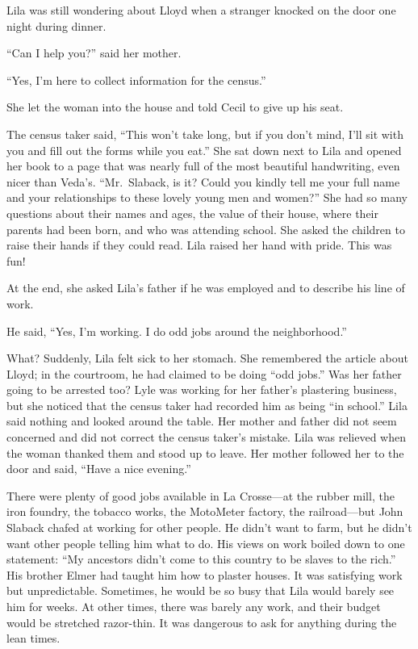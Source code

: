 \documentclass[
  american,
  letterpaper,
]{book}
\begin{document}
Lila was still wondering about Lloyd when a stranger knocked on the door
one night during dinner.

``Can I help you?'' said her mother.

``Yes, I'm here to collect information for the census.''

She let the woman into the house and told Cecil to give up his seat.

The census taker said, ``This won't take long, but if you don't mind,
I'll sit with you and fill out the forms while you eat.'' She sat down
next to Lila and opened her book to a page that was nearly full of the
most beautiful handwriting, even nicer than Veda's. ``Mr.~Slaback, is
it? Could you kindly tell me your full name and your relationships to
these lovely young men and women?'' She had so many questions about
their names and ages, the value of their house, where their parents had
been born, and who was attending school. She asked the children to raise
their hands if they could read. Lila raised her hand with pride. This
was fun!

At the end, she asked Lila's father if he was employed and to describe
his line of work.

He said, ``Yes, I'm working. I do odd jobs around the neighborhood.''

What? Suddenly, Lila felt sick to her stomach. She remembered the
article about Lloyd; in the courtroom, he had claimed to be doing ``odd
jobs.'' Was her father going to be arrested too? Lyle was working for
her father's plastering business, but she noticed that the census taker
had recorded him as being ``in school.'' Lila said nothing and looked
around the table. Her mother and father did not seem concerned and did
not correct the census taker's mistake. Lila was relieved when the woman
thanked them and stood up to leave. Her mother followed her to the door
and said, ``Have a nice evening.''

There were plenty of good jobs available in La Crosse---at the rubber
mill, the iron foundry, the tobacco works, the MotoMeter factory, the
railroad---but John Slaback chafed at working for other people. He
didn't want to farm, but he didn't want other people telling him what to
do. His views on work boiled down to one statement: ``My ancestors
didn't come to this country to be slaves to the rich.'' His brother
Elmer had taught him how to plaster houses. It was satisfying work but
unpredictable. Sometimes, he would be so busy that Lila would barely see
him for weeks. At other times, there was barely any work, and their
budget would be stretched razor-thin. It was dangerous to ask for
anything during the lean times.
\end{document}
